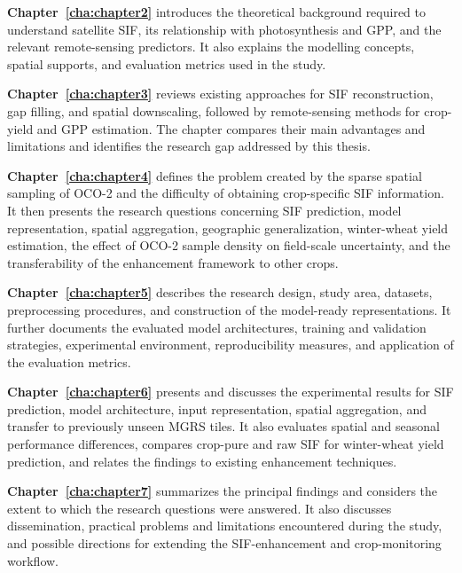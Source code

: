 \noindent\textbf{Chapter~\ref{cha:chapter2}} introduces the theoretical background required to understand satellite SIF, its relationship with photosynthesis and GPP, and the relevant remote-sensing predictors. It also explains the modelling concepts, spatial supports, and evaluation metrics used in the study.

\noindent\textbf{Chapter~\ref{cha:chapter3}} reviews existing approaches for SIF reconstruction, gap filling, and spatial downscaling, followed by remote-sensing methods for crop-yield and GPP estimation. The chapter compares their main advantages and limitations and identifies the research gap addressed by this thesis.

\noindent\textbf{Chapter~\ref{cha:chapter4}} defines the problem created by the sparse spatial sampling of OCO-2 and the difficulty of obtaining crop-specific SIF information. It then presents the research questions concerning SIF prediction, model representation, spatial aggregation, geographic generalization, winter-wheat yield estimation, the effect of OCO-2 sample density on field-scale uncertainty, and the transferability of the enhancement framework to other crops.

\noindent\textbf{Chapter~\ref{cha:chapter5}} describes the research design, study area, datasets, preprocessing procedures, and construction of the model-ready representations. It further documents the evaluated model architectures, training and validation strategies, experimental environment, reproducibility measures, and application of the evaluation metrics.

\noindent\textbf{Chapter~\ref{cha:chapter6}} presents and discusses the experimental results for SIF prediction, model architecture, input representation, spatial aggregation, and transfer to previously unseen MGRS tiles. It also evaluates spatial and seasonal performance differences, compares crop-pure and raw SIF for winter-wheat yield prediction, and relates the findings to existing enhancement techniques.

\noindent\textbf{Chapter~\ref{cha:chapter7}} summarizes the principal findings and considers the extent to which the research questions were answered. It also discusses dissemination, practical problems and limitations encountered during the study, and possible directions for extending the SIF-enhancement and crop-monitoring workflow.
